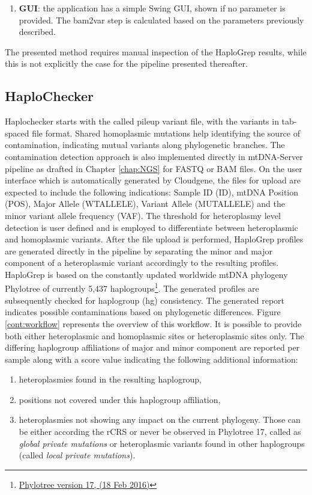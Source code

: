 \begin{enumerate}
\begin{lstlisting}[language=bash]
java -jar greenVC-0.1.jar lofreq --in inputfile.vcf --out haplogrepinput.hsd 
\end{lstlisting}
\item \textbf{GUI}: the application has a simple Swing GUI, shown if no parameter is provided. The bam2var step is calculated based on the parameters previously described.
\end{enumerate}
The presented method requires manual inspection of the HaploGrep results, while this is not explicitly the case for the pipeline presented thereafter. 
\subsection{HaploChecker}\label{cont:haplochecker}
Haplochecker starts with the called pileup variant file, with the variants in tab-spaced file format. Shared homoplasmic mutations help identifying the source of contamination, indicating mutual variants along phylogenetic branches. The contamination detection approach is also implemented directly in mtDNA-Server pipeline as drafted in Chapter \ref{chap:NGS} for FASTQ or BAM files. On the user interface which is automatically generated by Cloudgene, the files for upload are expected to include the following indications: Sample ID (ID), mtDNA Position (POS), Major Allele (WTALLELE), Variant Allele (MUTALLELE) and the minor variant allele frequency (VAF). The threshold for heteroplasmy level detection is user defined and is employed to differentiate between heteroplasmic and homoplasmic variants. After the file upload is performed, HaploGrep  profiles are generated directly in the pipeline by separating the minor and major component of a heteroplasmic variant accordingly to the resulting profiles. HaploGrep is based on the constantly updated worldwide mtDNA phylogeny Phylotree of currently 5,437 haplogroups\footnote{\url{Phylotree version 17, (18 Feb 2016)}}. The generated profiles are subsequently checked for haplogroup (hg) consistency. The generated report indicates possible contaminations based on phylogenetic differences. Figure \ref{cont:workflow} represents the overview of this workflow. It is possible to provide both either heteroplasmic and homoplasmic sites or heteroplasmic sites only. The differing haplogroup affiliations of major and minor component are reported per sample along with a score value indicating the following additional information: 
\begin{enumerate}[label=(\alph*)]
\item heteroplasmies found in the resulting haplogroup, 
\item positions not covered under this haplogroup affiliation, 
\item heteroplasmies not showing any impact on the current phylogeny. Those can be either according the rCRS or never be observed in Phylotree 17, called as \textit{global private mutations} or heteroplasmic variants found in other haplogroups (called \textit{local private mutations}).
\end{enumerate}
